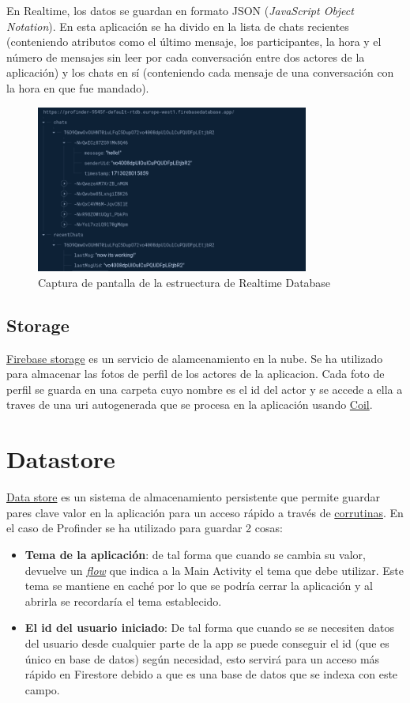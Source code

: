 En Realtime, los datos se guardan en formato JSON (\textit{JavaScript Object Notation}). En esta aplicación se ha divido en la lista de chats recientes (conteniendo atributos como el último mensaje, los participantes, la hora y el número de mensajes sin leer por cada conversación entre dos actores de la aplicación) y los chats en sí (conteniendo cada mensaje de una conversación con la hora en que fue mandado).
\begin{figure}[h]
    \centering
    \includegraphics[width = 0.8\textwidth]{Imagenes/Fuentes/ejemplo_realtime.png}
    \caption{Captura de pantalla de la estruectura de Realtime Database}
    \label{fig:ejemplo_realtime}
\end{figure}
\subsection{Storage}
\href{https://firebase.google.com/docs/storage/}{Firebase storage} es un servicio de alamcenamiento en la nube. Se ha utilizado para almacenar las fotos de perfil de los actores de la aplicacion. Cada foto de perfil se guarda en una carpeta cuyo nombre es el id del actor y se accede a ella a traves de una uri autogenerada que se procesa en la aplicación usando \hyperlink{subsec:coil}{Coil}.
\section{Datastore}
\href{https://developer.android.com/topic/libraries/architecture/datastore}{Data store} es un sistema de almacenamiento persistente que permite guardar pares clave valor en la aplicación para un acceso rápido a través de \href{https://developer.android.com/kotlin/coroutines}{corrutinas}. 
En el caso de Profinder se ha utilizado para guardar 2 cosas:
\begin{itemize}
    \item \textbf{Tema de la aplicación}: de tal forma que cuando se cambia su valor, devuelve un \href{https://developer.android.com/kotlin/flow}{\textit{flow}} que indica a la Main Activity el tema que debe utilizar. Este tema se mantiene en caché por lo que se podría cerrar la aplicación y al abrirla se recordaría el tema establecido.
    \item \textbf{El id del usuario iniciado}: De tal forma que cuando se se necesiten datos del usuario desde cualquier parte de la app se puede conseguir el id (que es único en base de datos) según necesidad, esto servirá para un acceso más rápido en Firestore debido a que es una base de datos que se indexa con este campo.
\end{itemize}

